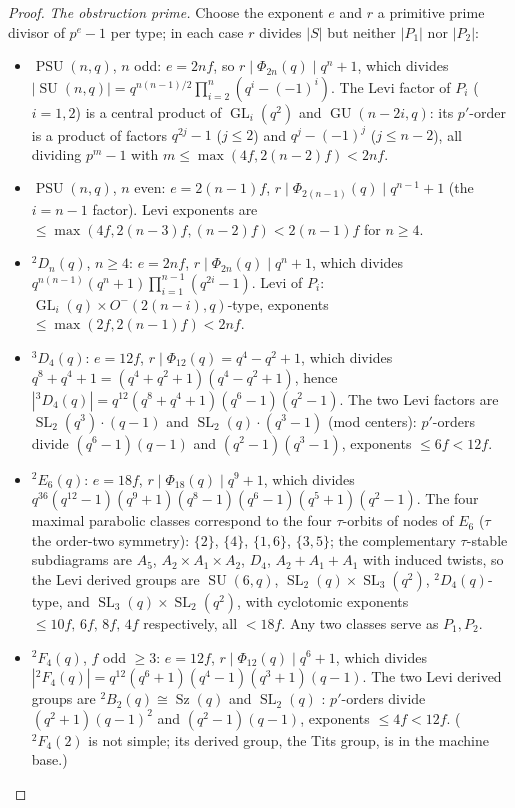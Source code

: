 \documentclass[11pt]{amsart}
\theoremstyle{definition}
\theoremstyle{remark}
\DeclareMathOperator{\PSU}{PSU}
\DeclareMathOperator{\SL}{SL}
\DeclareMathOperator{\SU}{SU}
\DeclareMathOperator{\GL}{GL}
\DeclareMathOperator{\GU}{GU}
\DeclareMathOperator{\Sz}{Sz}
\begin{document}
\begin{proof}
\emph{The obstruction prime.} Choose the exponent $e$ and $r$ a
primitive prime divisor of $p^{e}-1$ per type; in each case $r$ divides
$|S|$ but neither $|P_1|$ nor $|P_2|$:
\begin{itemize}
\item $\PSU(n,q)$, $n$ odd: $e=2nf$, so $r\mid\Phi_{2n}(q)\mid q^n+1$,
which divides $|\SU(n,q)|=q^{n(n-1)/2}\prod_{i=2}^n(q^i-(-1)^i)$. The
Levi factor of $P_i$ ($i=1,2$) is a central product of $\GL_i(q^2)$ and
$\GU(n-2i,q)$: its $p'$-order is a product of factors $q^{2j}-1$
($j\leq2$) and $q^j-(-1)^j$ ($j\leq n-2$), all dividing $p^m-1$ with
$m\leq\max(4f,2(n-2)f)<2nf$.
\item $\PSU(n,q)$, $n$ even: $e=2(n-1)f$,
$r\mid\Phi_{2(n-1)}(q)\mid q^{n-1}+1$ (the $i=n-1$ factor). Levi
exponents are $\leq\max(4f,2(n-3)f,(n-2)f)<2(n-1)f$ for $n\geq4$.
\item ${}^2D_n(q)$, $n\geq4$: $e=2nf$, $r\mid\Phi_{2n}(q)\mid q^n+1$,
which divides $q^{n(n-1)}(q^n+1)\prod_{i=1}^{n-1}(q^{2i}-1)$. Levi of
$P_i$: $\GL_i(q)\times O^-(2(n-i),q)$-type, exponents
$\leq\max(2f,2(n-1)f)<2nf$.
\item ${}^3D_4(q)$: $e=12f$, $r\mid\Phi_{12}(q)=q^4-q^2+1$, which
divides $q^8+q^4+1=(q^4+q^2+1)(q^4-q^2+1)$, hence
$|{}^3D_4(q)|=q^{12}(q^8+q^4+1)(q^6-1)(q^2-1)$. The two Levi factors
are $\SL_2(q^3)\cdot(q-1)$ and $\SL_2(q)\cdot(q^3-1)$ (mod centers):
$p'$-orders divide $(q^6-1)(q-1)$ and $(q^2-1)(q^3-1)$, exponents
$\leq6f<12f$.
\item ${}^2E_6(q)$: $e=18f$, $r\mid\Phi_{18}(q)\mid q^9+1$, which
divides $q^{36}(q^{12}-1)(q^9+1)(q^8-1)(q^6-1)(q^5+1)(q^2-1)$. The four
maximal parabolic classes correspond to the four $\tau$-orbits of nodes
of $E_6$ ($\tau$ the order-two symmetry): $\{2\}$, $\{4\}$, $\{1,6\}$,
$\{3,5\}$; the complementary $\tau$-stable subdiagrams are $A_5$,
$A_2{\times}A_1{\times}A_2$, $D_4$, $A_2{+}A_1{+}A_1$ with induced
twists, so the Levi derived groups are $\SU(6,q)$,
$\SL_2(q){\times}\SL_3(q^2)$, ${}^2D_4(q)$-type, and
$\SL_3(q){\times}\SL_2(q^2)$, with cyclotomic exponents
$\leq10f,\,6f,\,8f,\,4f$ respectively, all $<18f$. Any two classes
serve as $P_1,P_2$.
\item ${}^2F_4(q)$, $f$ odd $\geq3$: $e=12f$,
$r\mid\Phi_{12}(q)\mid q^6+1$, which divides
$|{}^2F_4(q)|=q^{12}(q^6+1)(q^4-1)(q^3+1)(q-1)$. The two Levi derived
groups are ${}^2B_2(q)\cong\Sz(q)$ and $\SL_2(q)$
\cite[\S2.9]{GLS3}: $p'$-orders divide $(q^2+1)(q-1)^2$ and
$(q^2-1)(q-1)$, exponents $\leq4f<12f$. (${}^2F_4(2)$ is not simple;
its derived group, the Tits group, is in the machine base.)
\end{itemize}


\end{proof}
\end{document}
